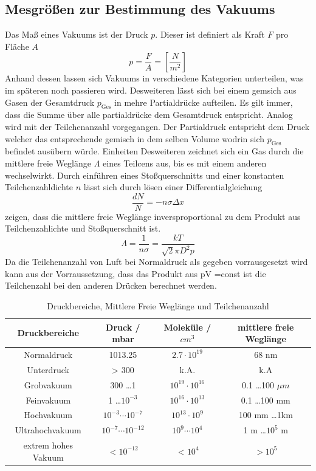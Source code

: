 \subsection{Mesgrößen zur Bestimmung des Vakuums}
Das Maß eines Vakuums ist der Druck $p$. Dieser ist definiert als Kraft $F$ pro Fläche $A$
\begin{equation}
  p = \frac{F}{A} = \left[ \frac{N}{m^2} \right]
  \label{eqn:druck}
\end{equation}
Anhand dessen lassen sich Vakuums in verschiedene Kategorien unterteilen, was im späteren noch passieren wird. Desweiteren lässt sich bei einem gemsich aus Gasen der Gesamtdruck $p_\text{Ges}$ in mehre Partialdrücke aufteilen. Es gilt immer, dass die Summe über alle partialdrücke dem Gesamtdruck entspricht. Analog wird mit der Teilchenanzahl vorgegangen. Der Partialdruck entspricht dem Druck welcher das entsprechende gemisch in dem selben Volume wodrin sich $p_\text{Ges}$ befindet ausübern würde. \newline
Einheiten \newline
Desweiteren zeichnet sich ein Gas durch die mittlere freie Weglänge $\Lambda$ eines Teilcens aus, bis es mit einem anderen wechselwirkt. Durch einführen eines Stoßquerschnitts und einer konstanten Teilchenzahldichte $n$ lässt sich durch lösen einer Differentialgleichung 
\begin{equation}
  \frac{dN}{N} = -n \sigma \Delta x
  \label{eqn:mfWDGL}
\end{equation}
zeigen, dass die mittlere freie Weglänge  inversproportional zu dem Produkt aus Teilchenzahlichte und Stoßquerschnitt ist.
\begin{equation}
  \Lambda = \frac{1}{n \sigma}= \frac{k T}{\sqrt{2} \pi D^2 p}
  \label{eqn:mfW}
\end{equation}
Da die Teilchenanzahl von Luft bei Normaldruck als gegeben vorrausgesetzt wird kann aus der Vorraussetzung, dass das Produkt aus pV =const ist die Teilchenzahl bei den anderen Drücken berechnet werden. 
\begin{table}
  \centering
  \caption{Druckbereiche, Mittlere Freie Weglänge und Teilchenanzahl}
  \begin{tabular}{c|c c c}
  	\toprule
	Druckbereiche & Druck / mbar & Moleküle / $cm^3$ & mittlere freie Weglänge \\
	\midrule
	Normaldruck	& 1013.25			& $2.7 \cdot 10^{19}$ &	68 nm \\
	Unterdruck	& > 300				& k.A. & k.A \\
	Grobvakuum	& 300 \ldots 1 			&$10^{19} \cdot 10^{16}$&0.1 \ldots 100 $\mu m$ \\
	Feinvakuum	& 1 \ldots $10^{-3}$		& $10^{16} \cdot 10^{13}$ & 0.1 \ldots 100 mm \\
	Hochvakuum	& $10^{-3} \cdots 10^{-7}$	& $10^{13} \cdot 10^{9}$ & 100 mm \ldots 1km \\
	Ultrahochvakuum	& $10^{-7} \cdots 10^{-12}$	& $10^9 \cdots 10^4$ & 1 m \ldots $10^5$ m \\
	extrem hohes Vakuum & $< 10^{-12}$		& $<10^4$ & $> 10^5$ \\
	\bottomrule
  \end{tabular}
  \label{tab:ueberblick}
\end{table}



